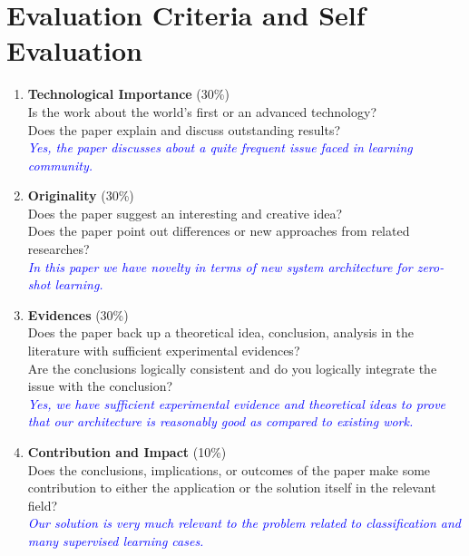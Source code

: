 \documentclass[11pt, conference, english]{IEEEtran}
\theoremstyle{plain}
\theoremstyle{definition}
\theoremstyle{remark}
\newcommand{\blue}[1]{\textcolor{blue}{#1}}
\begin{document}
\section{Evaluation Criteria and Self Evaluation}
\begin{enumerate}
	\item \textbf{Technological Importance} (30\%)\\
	Is the work about the world's first or an advanced technology?\\
	Does the paper explain and discuss outstanding results? \\
	\textit{\blue{Yes, the paper discusses about a quite frequent issue faced in learning community.}}
	
	\item \textbf{Originality} (30\%)\\
	Does the paper suggest an interesting and creative idea?\\
	Does the paper point out differences or new approaches from related researches?\\
	\textit{\blue{In this paper we have novelty in terms of new system architecture for zero-shot learning.}}
	\item \textbf{Evidences} (30\%)\\
	Does the paper back up a theoretical idea, conclusion, analysis in the literature with sufficient experimental evidences?\\
	Are the conclusions logically consistent and do you logically integrate the issue with the conclusion?\\
	\textit{\blue{Yes, we have sufficient experimental evidence and theoretical ideas to prove that our architecture is reasonably good as compared to existing work.}}
	\item \textbf{Contribution and Impact} (10\%)\\
	Does the conclusions, implications, or outcomes of the paper make some contribution to either the application or the solution itself in the relevant field?\\
	\textit{\blue{Our solution is very much relevant to the problem related to classification and many supervised learning cases.}}
	
	
	
\end{enumerate}
\end{document}
